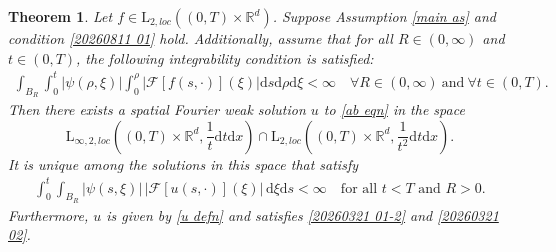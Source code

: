 \documentclass[11pt,reqno]{amsart}
\newtheorem{thm}{Theorem}[section]
\theoremstyle{definition}
\theoremstyle{remark}
\newcommand\bR{\mathbb{R}}
\newcommand\cF{\mathcal{F}}
\numberwithin{equation}{section}
\begin{document}
\begin{thm}
									\label{weak well}
Let $f \in \mathrm{L}_{2,loc}\left( (0,T) \times \bR^d \right)$. Suppose
Assumption \ref{main as} and condition \eqref{20260811 01} hold.
Additionally, assume that for all $R \in (0,\infty)$ and $t \in (0,T)$, the following integrability condition is satisfied:
\begin{align}
										\label{20260324 01}
\int_{B_R} \int_0^t |\psi(\rho,\xi)| \int_0^\rho |\cF[f(s,\cdot)](\xi)| \mathrm{d}s \mathrm{d}\rho \mathrm{d}\xi < \infty \quad \forall R \in (0,\infty)~\text{and}~ \forall t \in (0,T).
\end{align}
Then there exists a spatial Fourier weak solution $u$ to \eqref{ab eqn} in the space
$$
\mathrm{L}_{\infty,2, loc}\left( (0,T) \times \bR^d, \frac{1}{t}\mathrm{d}t \mathrm{d}x \right) \cap \mathrm{L}_{2, loc}\left( (0,T) \times \bR^d, \frac{1}{t^2}\mathrm{d}t\mathrm{d}x \right).
$$
It is unique among the solutions in this space that satisfy
\begin{align}
										\label{20260819 01}
\int_0^t\int_{B_R}|\psi(s,\xi)|\,|\cF[u(s,\cdot)](\xi)|
\,\mathrm{d}\xi\mathrm{d}s<\infty
\quad\text{for all }t<T\text{ and }R>0.
\end{align}
Furthermore, $u$ is given by \eqref{u defn} and satisfies
\eqref{20260321 01-2} and \eqref{20260321 02}.
\end{thm}
\end{document}
